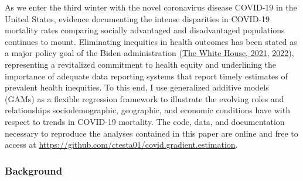 \documentclass[
]{article}
\begin{document}
As we enter the third winter with the novel coronavirus disease
COVID-19 in the United States, evidence documenting the intense disparities in
COVID-19 mortality rates comparing socially advantaged and disadvantaged
populations continues to mount. Eliminating inequities in health outcomes has
been stated as a major policy goal of the Biden administration
(\protect\hyperlink{ref-the_white_house_executive_2021}{The White House, 2021}, \protect\hyperlink{ref-the_white_house_advancing_2022}{2022}), representing
a revitalized commitment to health equity and underlining the importance of adequate
data reporting systems that report timely estimates of prevalent health inequities. To this
end, I use generalized additive models (GAMs) as a flexible regression
framework to illustrate the evolving roles and relationships sociodemographic,
geographic, and economic conditions have with respect to trends in COVID-19
mortality. The code, data, and documentation necessary to reproduce the analyses
contained in this paper are online and free to access at \url{https://github.com/ctesta01/covid.gradient.estimation}.

\hypertarget{background}{%
\subsubsection{Background}\label{background}}
\end{document}
